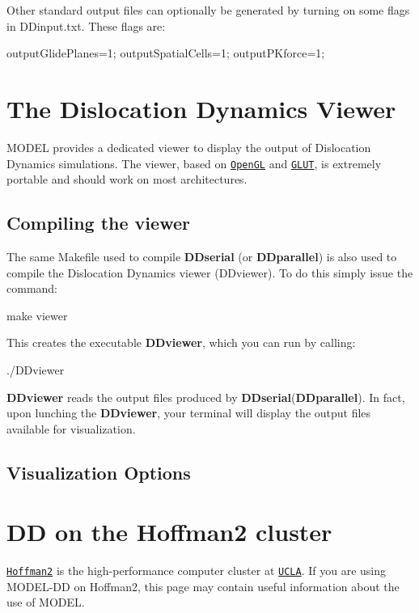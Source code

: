 Other standard output files can optionally be generated by turning on some flags in D\+Dinput.\+txt. These flags are\+: \begin{DoxyVerb}outputGlidePlanes=1;
outputSpatialCells=1;
outputPKforce=1;
\end{DoxyVerb}
 \hypertarget{DD_visualization}{}\section{The Dislocation Dynamics Viewer}\label{DD_visualization}
M\+O\+D\+E\+L provides a dedicated viewer to display the output of Dislocation Dynamics simulations. The viewer, based on \href{http://www.opengl.org}{\tt Open\+G\+L} and \href{http://www.opengl.org/resources/libraries/glut/}{\tt G\+L\+U\+T}, is extremely portable and should work on most architectures.\hypertarget{_d_d_visualization_DD_viewer_compiling}{}\subsection{Compiling the viewer}\label{_d_d_visualization_DD_viewer_compiling}
The same Makefile used to compile {\bfseries D\+Dserial} (or {\bfseries D\+Dparallel}) is also used to compile the Dislocation Dynamics viewer (D\+Dviewer). To do this simply issue the command\+: \begin{DoxyVerb}make viewer
\end{DoxyVerb}
 This creates the executable {\bfseries D\+Dviewer}, which you can run by calling\+: \begin{DoxyVerb}./DDviewer
\end{DoxyVerb}


{\bfseries D\+Dviewer} reads the output files produced by {\bfseries D\+Dserial}({\bfseries D\+Dparallel}). In fact, upon lunching the {\bfseries D\+Dviewer}, your terminal will display the output files available for visualization.\hypertarget{_d_d_visualization_DD_visualization_options}{}\subsection{Visualization Options}\label{_d_d_visualization_DD_visualization_options}
      \hypertarget{hoffman2}{}\section{D\+D on the Hoffman2 cluster}\label{hoffman2}
\href{https://idre.ucla.edu/hoffman2}{\tt Hoffman2} is the high-\/performance computer cluster at \href{http://www.ucla.edu}{\tt U\+C\+L\+A}. If you are using M\+O\+D\+E\+L-\/\+D\+D on Hoffman2, this page may contain useful information about the use of M\+O\+D\+E\+L.

